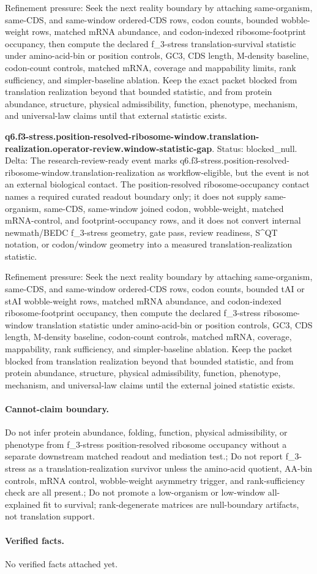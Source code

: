 Refinement pressure: Seek the next reality boundary by attaching same-organism, same-CDS, and same-window ordered-CDS rows, codon counts, bounded wobble-weight rows, matched mRNA abundance, and codon-indexed ribosome-footprint occupancy, then compute the declared f\_3-stress translation-survival statistic under amino-acid-bin or position controls, GC3, CDS length, M-density baseline, codon-count controls, matched mRNA, coverage and mappability limits, rank sufficiency, and simpler-baseline ablation. Keep the exact packet blocked from translation realization beyond that bounded statistic, and from protein abundance, structure, physical admissibility, function, phenotype, mechanism, and universal-law claims until that external statistic exists.

\textbf{q6.f3-stress.position-resolved-ribosome-window.translation-realization.operator-review.window-statistic-gap}. Status: blocked\_null. Delta: The research-review-ready event marks q6.f3-stress.position-resolved-ribosome-window.translation-realization as workflow-eligible, but the event is not an external biological contact. The position-resolved ribosome-occupancy contact names a required curated readout boundary only; it does not supply same-organism, same-CDS, same-window joined codon, wobble-weight, matched mRNA-control, and footprint-occupancy rows, and it does not convert internal newmath/BEDC f\_3-stress geometry, gate pass, review readiness, S\textasciicircum{}QT notation, or codon/window geometry into a measured translation-realization statistic.

Refinement pressure: Seek the next reality boundary by attaching same-organism, same-CDS, and same-window ordered-CDS rows, codon counts, bounded tAI or stAI wobble-weight rows, matched mRNA abundance, and codon-indexed ribosome-footprint occupancy, then compute the declared f\_3-stress ribosome-window translation statistic under amino-acid-bin or position controls, GC3, CDS length, M-density baseline, codon-count controls, matched mRNA, coverage, mappability, rank sufficiency, and simpler-baseline ablation. Keep the packet blocked from translation realization beyond that bounded statistic, and from protein abundance, structure, physical admissibility, function, phenotype, mechanism, and universal-law claims until the external joined statistic exists.

\paragraph{Cannot-claim boundary.} Do not infer protein abundance, folding, function, physical admissibility, or phenotype from f\_3-stress position-resolved ribosome occupancy without a separate downstream matched readout and mediation test.; Do not report f\_3-stress as a translation-realization survivor unless the amino-acid quotient, AA-bin controls, mRNA control, wobble-weight asymmetry trigger, and rank-sufficiency check are all present.; Do not promote a low-organism or low-window all-explained fit to survival; rank-degenerate matrices are null-boundary artifacts, not translation support.

\paragraph{Verified facts.}
No verified facts attached yet.
